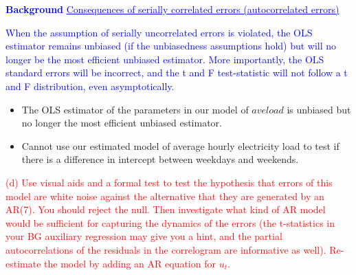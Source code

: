 \documentclass[12pt]{report}
\newenvironment{blueframed}[1][blue]
{\def\FrameCommand{\fboxsep=\FrameSep\fcolorbox{#1}{white}}%
\MakeFramed {\advance\hsize-\width \FrameRestore}}
{\endMakeFramed}
\begin{document}
\justify
\begin{blueframed}
	\textcolor{blue}{\textbf{Background}}
	\vspace{-\baselineskip}
	\justify
	\textcolor{blue}{\underline{Consequences of serially correlated errors (autocorrelated errors)}}
	
	\noindent \textcolor{blue}
	{
		When the assumption of serially uncorrelated errors is violated, the OLS estimator remains unbiased (if the unbiasedness assumptions hold) but will no longer be the most efficient unbiased estimator. More importantly, the OLS standard errors will be incorrect, and the t and F test-statistic will not follow a t and F distribution, even asymptotically.
	}
\end{blueframed}
\begin{itemize}
	\item The OLS estimator of the parameters in our model of $aveload$ is unbiased but no longer the most efficient unbiased estimator.
	\item Cannot use our estimated model of average hourly electricity load to test if there is a difference in intercept between weekdays and weekends.
\end{itemize}



\newpage
\noindent \textcolor{red}
{
	(d) Use visual aids and a formal test to test the hypothesis that errors of this model are white noise against the alternative that they are generated by an AR(7). You should reject the null. Then investigate what kind of AR model would be sufficient for capturing the dynamics of the errors (the t-statistics in your BG auxiliary regression may give you a hint, and the partial autocorrelations of the residuals in the correlogram are informative as well). Re-estimate the model by adding an AR equation for $u_t$.
}
\end{document}
